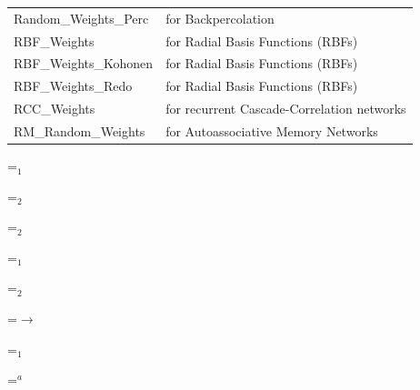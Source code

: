 {\begin{tabular}{|l|l|}
Random\_Weights\_Perc \hspace{0.5cm} & for Backpercolation\\  
RBF\_Weights \hspace{0.5cm}          & for Radial Basis Functions (RBFs)\\ 
RBF\_Weights\_Kohonen \hspace{0.5cm} & for Radial Basis Functions (RBFs)\\ 
RBF\_Weights\_Redo \hspace{0.5cm}    & for Radial Basis Functions (RBFs)\\ 
RCC\_Weights \hspace{0.5cm}      & for recurrent Cascade-Correlation networks\\ 
RM\_Random\_Weights \hspace{0.5cm}   & for Autoassociative Memory Networks\\ 
\hline
\end{tabular}
}

{\newpage
\clearpage
\samepage \setbox\sizebox=\hbox{$_1$}\box\sizebox
}

{\newpage
\clearpage
\samepage \setbox\sizebox=\hbox{$_2$}\box\sizebox
}

{\newpage
\clearpage
\samepage \setbox\sizebox=\hbox{$_2$}\box\sizebox
}

{\newpage
\clearpage
\samepage \setbox\sizebox=\hbox{$_1$}\box\sizebox
}

{\newpage
\clearpage
\samepage \setbox\sizebox=\hbox{$_2$}\box\sizebox
}

{\newpage
\clearpage
\samepage \setbox\sizebox=\hbox{$\rightarrow$}\box\sizebox
}

{\newpage
\clearpage
\samepage \setbox\sizebox=\hbox{$_1$}\box\sizebox
}

{\newpage
\clearpage
\samepage \setbox\sizebox=\hbox{$^a$}\box\sizebox
}

